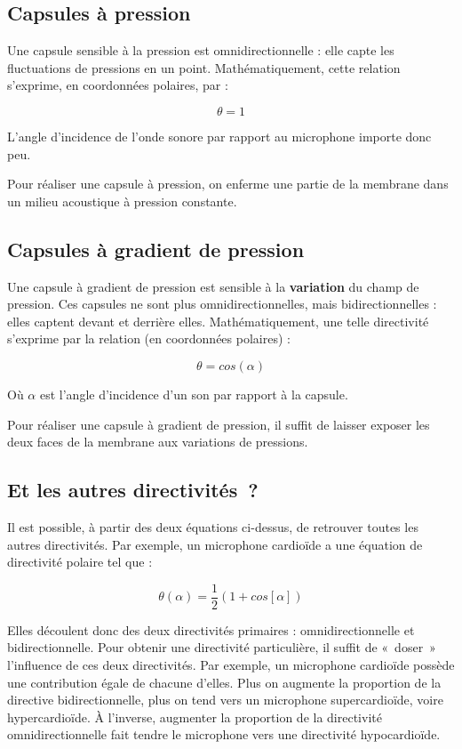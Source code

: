 \documentclass[
]{book}
\begin{document}
\hypertarget{capsules-uxe0-pression}{%
\subsection{Capsules à pression}\label{capsules-uxe0-pression}}

Une capsule sensible à la pression est omnidirectionnelle : elle capte les fluctuations de pressions en un point. Mathématiquement, cette relation s'exprime, en coordonnées polaires, par :

\[ \theta = 1 \]

L'angle d'incidence de l'onde sonore par rapport au microphone importe donc peu.

Pour réaliser une capsule à pression, on enferme une partie de la membrane dans un milieu acoustique à pression constante.

\hypertarget{capsules-uxe0-gradient-de-pression}{%
\subsection{Capsules à gradient de pression}\label{capsules-uxe0-gradient-de-pression}}

Une capsule à gradient de pression est sensible à la \textbf{variation} du champ de pression. Ces capsules ne sont plus omnidirectionnelles, mais bidirectionnelles : elles captent devant et derrière elles. Mathématiquement, une telle directivité s'exprime par la relation (en coordonnées polaires) :

\[ \theta = cos(\alpha) \]

Où \(\alpha\) est l'angle d'incidence d'un son par rapport à la capsule.

Pour réaliser une capsule à gradient de pression, il suffit de laisser exposer les deux faces de la membrane aux variations de pressions.

\hypertarget{et-les-autres-directivituxe9s}{%
\subsection{Et les autres directivités~?}\label{et-les-autres-directivituxe9s}}

Il est possible, à partir des deux équations ci-dessus, de retrouver toutes les autres directivités. Par exemple, un microphone cardioïde a une équation de directivité polaire tel que :

\[ \theta(\alpha) = \frac{1}{2}(1 + cos[\alpha]) \]

Elles découlent donc des deux directivités primaires : omnidirectionnelle et bidirectionnelle. Pour obtenir une directivité particulière, il suffit de «~doser~» l'influence de ces deux directivités. Par exemple, un microphone cardioïde possède une contribution égale de chacune d'elles. Plus on augmente la proportion de la directive bidirectionnelle, plus on tend vers un microphone supercardioïde, voire hypercardioïde. À l'inverse, augmenter la proportion de la directivité omnidirectionnelle fait tendre le microphone vers une directivité hypocardioïde.
\end{document}
